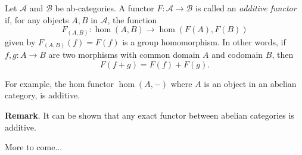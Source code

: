 \documentclass[12pt]{article}
\begin{document}
Let $\mathcal{A}$ and $\mathcal{B}$ be ab-categories.  A functor $F:\mathcal{A}\to \mathcal{B}$ is called an \emph{additive functor} if, for any objects $A,B$ in $\mathcal{A}$, the function $$F_{(A,B)}: \hom(A,B)\to \hom(F(A),F(B))$$ given by $F_{(A,B)}(f)=F(f)$ is a group homomorphism.  In other words, if $f,g: A\to B$ are two morphisms with common domain $A$ and codomain $B$, then $$F(f+g)=F(f)+F(g).$$

For example, the hom functor $\hom(A,-)$ where $A$ is an object in an abelian category, is additive.

\textbf{Remark}.  It can be shown that any exact functor between abelian categories is additive.

More to come...
\end{document}
